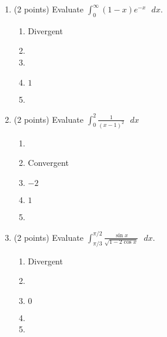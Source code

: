 \documentclass[paper=a4, fontsize=11pt]{scrartcl} %
\numberwithin{equation}{section} %
\numberwithin{figure}{section} %
\numberwithin{table}{section} %
\begin{document}
\begin{enumerate}
\item (2 points) Evaluate \large$\int_0^{\infty}(1-x)e^{-x}\text{  }dx$.
\vspace{2mm}
 \normalsize \begin{enumerate}
    \item Divergent
    \item {}
    \item {}
    \item $1$
    \item {}
  \end{enumerate}
  \vspace{1in}
\item (2 points) Evaluate \large $\int_0^2\frac{1}{(x-1)^2}\text{  }dx$
\normalsize \begin{enumerate}
    \item {}
    \item Convergent
    \item $-2$
    \item $1$
    \item {}
  \end{enumerate}
  \vspace{1in}
\item (2 points) Evaluate \large$\int_{\pi/3}^{\pi/2}\frac{\sin x}{\sqrt{1-2\cos x}}\text{  }dx$.
  \vspace{2mm}
   \normalsize \begin{enumerate}
      \item Divergent
      \item {}
      \item $0$
      \item {}
      \item {}
      \end{enumerate}
\end{enumerate}



\end{document}
